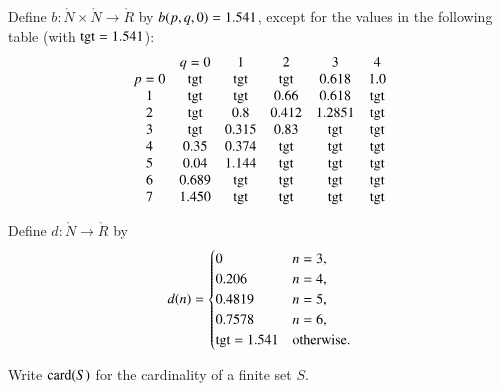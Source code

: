 \begin{definition}[b]
  Define $b:\ring{N}\times \ring{N}\to \ring{R}$ by $b(p,q,0)=1.541$,
  except for the values in the following table
  (with  ${\operatorname{tgt}}=1.541$):
  {
  \def\tx{\op{tgt}}
  $$\begin{matrix}  &q=0&1&2&3&4\\
           p=0&\tx&\tx&\tx&0.618&1.0\\
           1&\tx&\tx&0.66&0.618&\tx\\
           2&\tx&0.8&0.412&1.2851&\tx\\
           3&\tx&0.315&0.83&\tx&\tx\\
           4&0.35&0.374&\tx&\tx&\tx\\
           5&0.04&1.144&\tx&\tx&\tx\\
           6&0.689&\tx&\tx&\tx&\tx\\
           7&1.450&\tx&\tx&\tx&\tx
   \end{matrix}
   $$
   }
\end{definition}


\begin{definition}[d]
    Define $d:\ring{N}\to \ring{R}$ by
  $$d(n) = \begin{cases}
    0 & n=3, \\
    0.206 & n=4, \\
    0.4819 & n=5, \\
    0.7578 & n=6, \\
    {\operatorname{tgt}}=1.541 & \text{otherwise}.
  \end{cases}
  $$
\end{definition}


Write ${\operatorname{card}}(S)$ for the cardinality of a finite set $S$.


